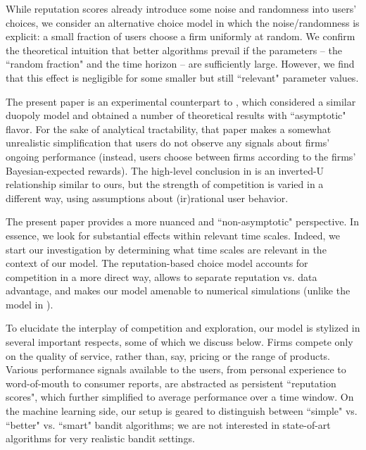 \documentclass[../competing_bandits_with_appendix.tex]{subfiles}
\begin{document}
While reputation scores already introduce some noise and randomness into users' choices, we consider an alternative choice model in which the noise/randomness is explicit: a small fraction of users choose a firm uniformly at random. We confirm the theoretical intuition that better algorithms prevail if the parameters -- the ``random fraction" and the time horizon -- are sufficiently large. However, we find that this effect is negligible for some smaller but still ``relevant" parameter values.

The present paper is an experimental counterpart to \cite{CompetingBandits-itcs18}, which considered a similar duopoly model and obtained a number of theoretical results with ``asymptotic" flavor. For the sake of analytical tractability, that paper makes a somewhat unrealistic simplification that users do not observe any signals about firms' ongoing performance (instead, users choose between firms according to the firms' Bayesian-expected rewards). The high-level conclusion in \cite{CompetingBandits-itcs18} is an inverted-U relationship similar to ours, but the strength of competition is varied in a different way, using assumptions about (ir)rational user behavior.

The present paper provides a more nuanced and ``non-asymptotic" perspective. In essence, we look for substantial effects within relevant time scales. Indeed, we start our investigation by determining what time scales are relevant in the context of our model. The reputation-based choice model accounts for competition in a more direct way, allows to separate reputation vs. data advantage, and makes our model amenable to numerical simulations (unlike the model in \cite{CompetingBandits-itcs18}).

To elucidate the interplay of competition and exploration, our model is stylized in several important  respects, some of which we discuss below. Firms compete only on the quality of service, rather than, say, pricing or the range of products. Various performance signals available to the users, from personal experience to word-of-mouth to consumer reports, are abstracted as persistent ``reputation scores", which further simplified to average performance over a time window.  On the machine learning side, our setup is geared to distinguish between ``simple" vs. ``better" vs. ``smart" bandit algorithms; we are not interested in state-of-art algorithms for very realistic bandit settings.
\end{document}
